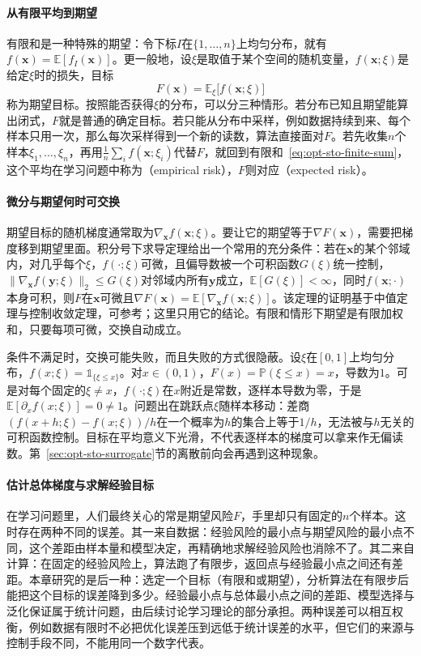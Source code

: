 \paragraph{从有限平均到期望}
有限和是一种特殊的期望：令下标$I$在$\{1,\dots,n\}$上均匀分布，就有$f(\bm x)=\mathbb E[f_I(\bm x)]$。更一般地，设$\xi$是取值于某个空间的随机变量，$f(\bm x;\xi)$是给定$\xi$时的损失，目标
\begin{equation}
\label{eq:opt-sto-expectation}
  F(\bm x)=\mathbb E_\xi\bigl[f(\bm x;\xi)\bigr]
\end{equation}
称为期望目标。按照能否获得$\xi$的分布，可以分三种情形。若分布已知且期望能算出闭式，$F$就是普通的确定目标。若只能从分布中采样，例如数据持续到来、每个样本只用一次，那么每次采样得到一个新的读数，算法直接面对$F$。若先收集$n$个样本$\xi_1,\dots,\xi_n$，再用$\frac1n\sum_if(\bm x;\xi_i)$代替$F$，就回到有限和~\eqref{eq:opt-sto-finite-sum}，这个平均在学习问题中称为（empirical risk），$F$则对应（expected risk）。

\paragraph{微分与期望何时可交换}
期望目标的随机梯度通常取为$\nabla_{\bm x}f(\bm x;\xi)$。要让它的期望等于$\nabla F(\bm x)$，需要把梯度移到期望里面。积分号下求导定理给出一个常用的充分条件：若在$\bm x$的某个邻域内，对几乎每个$\xi$，$f(\cdot;\xi)$可微，且偏导数被一个可积函数$G(\xi)$统一控制，$\lVert\nabla_{\bm x}f(\bm y;\xi)\rVert_2\leq G(\xi)$对邻域内所有$\bm y$成立，$\mathbb E[G(\xi)]<\infty$，同时$f(\bm x;\cdot)$本身可积，则$F$在$\bm x$可微且$\nabla F(\bm x)=\mathbb E[\nabla_{\bm x}f(\bm x;\xi)]$。该定理的证明基于中值定理与控制收敛定理，可参考；这里只用它的结论。有限和情形下期望是有限加权和，只要每项可微，交换自动成立。

条件不满足时，交换可能失败，而且失败的方式很隐蔽。设$\xi$在$[0,1]$上均匀分布，$f(x;\xi)=\mathbb 1_{\{\xi\leq x\}}$。对$x\in(0,1)$，$F(x)=\mathbb P(\xi\leq x)=x$，导数为$1$。可是对每个固定的$\xi\neq x$，$f(\cdot;\xi)$在$x$附近是常数，逐样本导数为零，于是$\mathbb E[\partial_xf(x;\xi)]=0\neq1$。问题出在跳跃点$\xi$随样本移动：差商$(f(x+h;\xi)-f(x;\xi))/h$在一个概率为$h$的集合上等于$1/h$，无法被与$h$无关的可积函数控制。目标在平均意义下光滑，不代表逐样本的梯度可以拿来作无偏读数。第~\ref{sec:opt-sto-surrogate}节的离散前向会再遇到这种现象。

\paragraph{估计总体梯度与求解经验目标}
在学习问题里，人们最终关心的常是期望风险$F$，手里却只有固定的$n$个样本。这时存在两种不同的误差。其一来自数据：经验风险的最小点与期望风险的最小点不同，这个差距由样本量和模型决定，再精确地求解经验风险也消除不了。其二来自计算：在固定的经验风险上，算法跑了有限步，返回点与经验最小点之间还有差距。本章研究的是后一种：选定一个目标（有限和或期望），分析算法在有限步后能把这个目标的误差降到多少。经验最小点与总体最小点之间的差距、模型选择与泛化保证属于统计问题，由后续讨论学习理论的部分承担。两种误差可以相互权衡，例如数据有限时不必把优化误差压到远低于统计误差的水平，但它们的来源与控制手段不同，不能用同一个数字代表。

